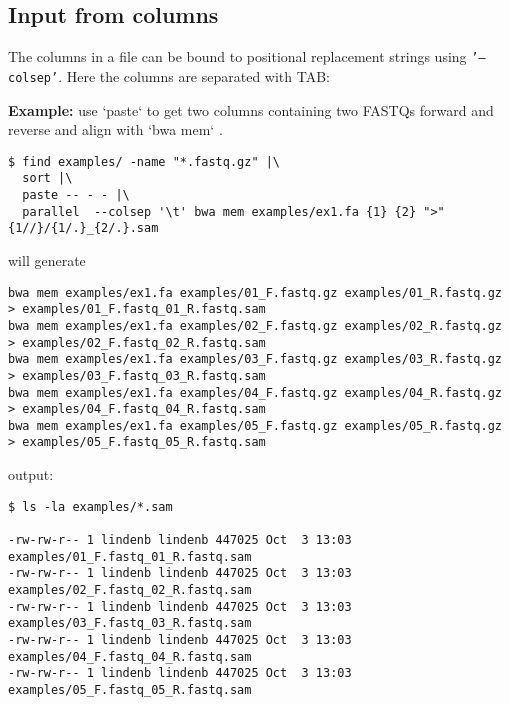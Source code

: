 \documentclass{article}
\newcommand{\example}[1]{
\textbf{Example: } {\color[rgb]{0,0,1} #1 } .
}
\newcommand{\cmdoption}[1]{\texttt{'#1'}}
\begin{document}
\subsection{Input from columns}

The columns in a file can be bound to positional replacement strings using \cmdoption{--colsep}. Here the columns are separated with TAB:

\example{use `paste` to get two columns containing two FASTQs forward and reverse and align with `bwa mem`}
\begin{lstlisting}
$ find examples/ -name "*.fastq.gz" |\
  sort |\
  paste -- - - |\
  parallel  --colsep '\t' bwa mem examples/ex1.fa {1} {2} ">" {1//}/{1/.}_{2/.}.sam
\end{lstlisting}
will generate
\begin{lstlisting}
bwa mem examples/ex1.fa examples/01_F.fastq.gz examples/01_R.fastq.gz > examples/01_F.fastq_01_R.fastq.sam
bwa mem examples/ex1.fa examples/02_F.fastq.gz examples/02_R.fastq.gz > examples/02_F.fastq_02_R.fastq.sam
bwa mem examples/ex1.fa examples/03_F.fastq.gz examples/03_R.fastq.gz > examples/03_F.fastq_03_R.fastq.sam
bwa mem examples/ex1.fa examples/04_F.fastq.gz examples/04_R.fastq.gz > examples/04_F.fastq_04_R.fastq.sam
bwa mem examples/ex1.fa examples/05_F.fastq.gz examples/05_R.fastq.gz > examples/05_F.fastq_05_R.fastq.sam
\end{lstlisting}
output:
\begin{lstlisting}
$ ls -la examples/*.sam

-rw-rw-r-- 1 lindenb lindenb 447025 Oct  3 13:03 examples/01_F.fastq_01_R.fastq.sam
-rw-rw-r-- 1 lindenb lindenb 447025 Oct  3 13:03 examples/02_F.fastq_02_R.fastq.sam
-rw-rw-r-- 1 lindenb lindenb 447025 Oct  3 13:03 examples/03_F.fastq_03_R.fastq.sam
-rw-rw-r-- 1 lindenb lindenb 447025 Oct  3 13:03 examples/04_F.fastq_04_R.fastq.sam
-rw-rw-r-- 1 lindenb lindenb 447025 Oct  3 13:03 examples/05_F.fastq_05_R.fastq.sam
\end{lstlisting}
\end{document}
